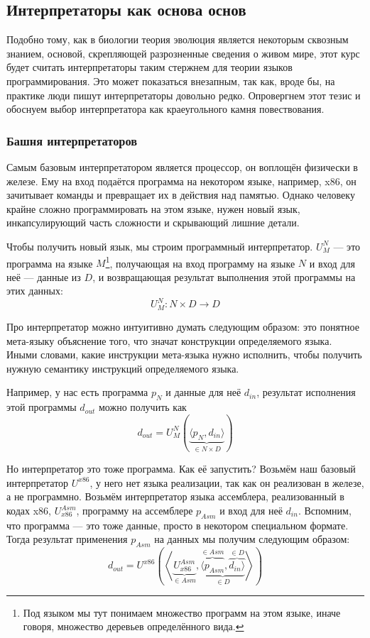 
\subsection{Интерпретаторы как основа основ} \label{subsec:all-interpreters}

Подобно тому, как в биологии теория эволюция является некоторым сквозным знанием, основой, скрепляющей разрозненные сведения о живом мире, этот курс будет считать интерпретаторы таким стержнем для теории языков программирования.
Это может показаться внезапным, так как, вроде бы, на практике люди пишут интерпретаторы довольно редко.
Опровергнем этот тезис и обоснуем выбор интерпретатора как краеугольного камня повествования.

\subsubsection{Башня интерпретаторов}

Самым базовым интерпретатором является процессор, он воплощён физически в железе.
Ему на вход подаётся программа на некотором языке, например, x86, он зачитывает команды и превращает их в действия над памятью.
Однако человеку крайне сложно программировать на этом языке, нужен новый язык, инкапсулирующий часть сложности и скрывающий лишние детали.

Чтобы получить новый язык, мы строим программный интерпретатор.
 $U_M^N$ --- это программа на языке $M$\footnote{Под языком мы тут понимаем множество программ на этом языке, иначе говоря, множество деревьев определённого вида.}, получающая на вход программу на языке $N$ и вход для неё --- данные из $D$, и возвращающая результат выполнения этой программы на этих данных: \[U_M^N : N\times D\to D\]

Про интерпретатор можно интуитивно думать следующим образом: это понятное мета-языку объяснение того, что значат конструкции определяемого языка.
Иными словами, какие инструкции мета-языка нужно исполнить, чтобы получить нужную семантику инструкций определяемого языка.

Например, у нас есть программа $p_N$ и данные для неё $d_{in}$, результат исполнения этой программы $d_{out}$ можно получить как \[d_{out} = U_M^N\left( \underbrace{\langle p_N, d_{in} \rangle}_{\in N\times D} \right)\]

Но интерпретатор это тоже программа.
Как её запустить?
Возьмём наш базовый интерпретатор $U^{x86}$, у него нет языка реализации, так как он реализован в железе, а не программно.
Возьмём интерпретатор языка ассемблера, реализованный в кодах x86, $U_{x86}^{Asm}$, программу на ассемблере $p_{Asm}$ и вход для неё $d_{in}$.
Вспомним, что программа --- это тоже данные, просто в некотором специальном формате.
Тогда результат применения $p_{Asm}$ на данных мы получим следующим образом:
\[
    d_{out} = U^{x86}\left(\left<\underbrace{U_{x86}^{Asm}}_{\in Asm}, \underbrace{\overbrace{\langle p_{Asm}}^{\in Asm}, \overbrace{d_{in} \rangle}^{\in D}}_{\in D} \right>\right)
\]

